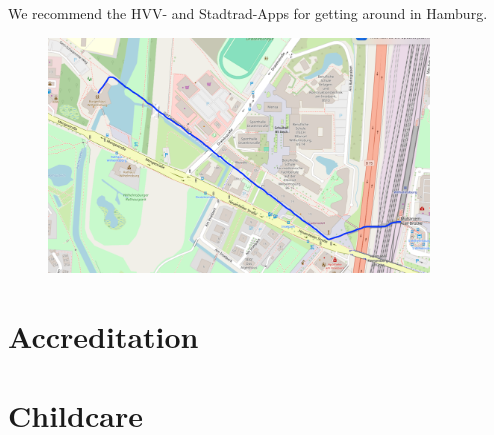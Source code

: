 We recommend the HVV- and Stadtrad-Apps for getting around in Hamburg.

\begin{figure}[H]
	\centering
	\includegraphics[width=0.9\textwidth]{tex/images/infos/venue_path.png}
\end{figure}


\section*{Accreditation}



\section*{Childcare}


